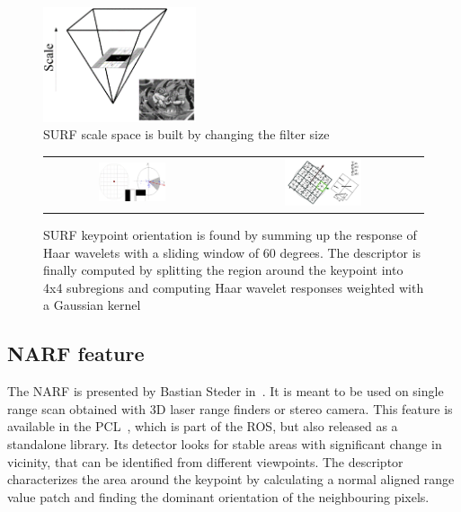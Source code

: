 \begin{figure}[H]
\centering
\includegraphics[width=0.4\textwidth]{figures/surf_scale}
\caption{SURF scale space is built by changing the filter size}
\label{fig:surf_scale}
\end{figure}

\begin{figure}[H]
\centering
 \begin{tabular}{cc}
 \includegraphics[width=0.4\textwidth]{figures/surf_orientation} &
 \includegraphics[width=0.4\textwidth]{figures/surf_descriptor}
\end{tabular}
\caption{SURF keypoint orientation is found by summing up the response of Haar wavelets with a sliding window of 60 degrees. The descriptor is finally computed by splitting the region around the keypoint into 4x4 subregions and computing Haar wavelet responses weighted with a Gaussian kernel}
\label{fig:surf_descriptor}
\end{figure}

\subsection{NARF feature}

The \gls{NARF} is presented by Bastian Steder in~\cite{steder10irosws}. It is meant to be used on single range scan obtained with 3D laser range finders or stereo camera. This feature is available in the \gls{PCL}~\cite{Rusu_ICRA2011_PCL}, which is part of the \gls{ROS}, but also released as a standalone library. Its detector looks for stable areas with significant change in vicinity, that can be identified from different viewpoints. The descriptor characterizes the area around the keypoint by calculating a normal aligned range value patch and finding the dominant orientation of the neighbouring pixels.

